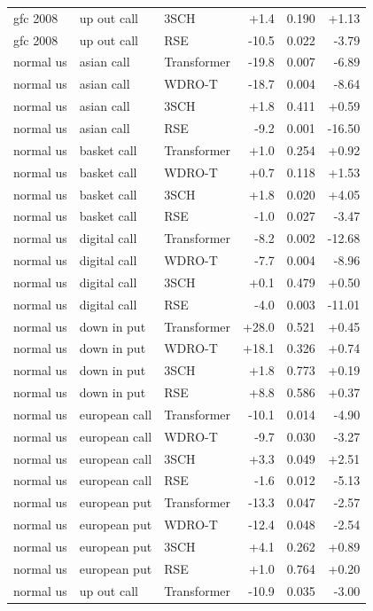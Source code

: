 \begin{table}[h]
\begin{tabular}{lllrrr}
gfc 2008 & up out call & 3SCH & +1.4 & 0.190 & +1.13 \\
gfc 2008 & up out call & RSE & -10.5 & 0.022 & -3.79 \\
normal us & asian call & Transformer & -19.8 & 0.007 & -6.89 \\
normal us & asian call & WDRO-T & -18.7 & 0.004 & -8.64 \\
normal us & asian call & 3SCH & +1.8 & 0.411 & +0.59 \\
normal us & asian call & RSE & -9.2 & 0.001 & -16.50 \\
normal us & basket call & Transformer & +1.0 & 0.254 & +0.92 \\
normal us & basket call & WDRO-T & +0.7 & 0.118 & +1.53 \\
normal us & basket call & 3SCH & +1.8 & 0.020 & +4.05 \\
normal us & basket call & RSE & -1.0 & 0.027 & -3.47 \\
normal us & digital call & Transformer & -8.2 & 0.002 & -12.68 \\
normal us & digital call & WDRO-T & -7.7 & 0.004 & -8.96 \\
normal us & digital call & 3SCH & +0.1 & 0.479 & +0.50 \\
normal us & digital call & RSE & -4.0 & 0.003 & -11.01 \\
normal us & down in put & Transformer & +28.0 & 0.521 & +0.45 \\
normal us & down in put & WDRO-T & +18.1 & 0.326 & +0.74 \\
normal us & down in put & 3SCH & +1.8 & 0.773 & +0.19 \\
normal us & down in put & RSE & +8.8 & 0.586 & +0.37 \\
normal us & european call & Transformer & -10.1 & 0.014 & -4.90 \\
normal us & european call & WDRO-T & -9.7 & 0.030 & -3.27 \\
normal us & european call & 3SCH & +3.3 & 0.049 & +2.51 \\
normal us & european call & RSE & -1.6 & 0.012 & -5.13 \\
normal us & european put & Transformer & -13.3 & 0.047 & -2.57 \\
normal us & european put & WDRO-T & -12.4 & 0.048 & -2.54 \\
normal us & european put & 3SCH & +4.1 & 0.262 & +0.89 \\
normal us & european put & RSE & +1.0 & 0.764 & +0.20 \\
normal us & up out call & Transformer & -10.9 & 0.035 & -3.00 \\

\end{tabular}
\end{table}
